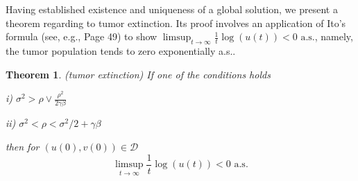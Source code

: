 \documentclass{aims}
\newtheorem{theorem}{Theorem}[section]
\theoremstyle{definition}
\begin{document}
 Having established existence and uniqueness of a global solution, we present
 a theorem regarding to tumor extinction. Its proof involves an application of Ito's formula (see, e.g., \cite{OksendalSDEBook} Page 49) to show $\limsup_{t\to\infty}\frac{1}{t}\log(u(t))<0\text{ a.s.}$, namely, the tumor population tends to zero exponentially a.s..   
 \begin{theorem}
 \label{thm:(tumor-extinction)}\textup{(tumor extinction)} If one
 of the conditions holds 
 
 i) $\sigma^{2}>\rho\vee\frac{\rho^{2}}{2\gamma\beta}$
 
 ii) $\sigma^{2}<\rho<\sigma^{2}/2+\gamma\beta$
 
 then for $(u(0),v(0))\in\mathcal{D}$
 \[
 \limsup_{t\to\infty}\frac{1}{t}\log(u(t))<0\text{ a.s.}
 \]
 \end{theorem}
 
\end{document}
